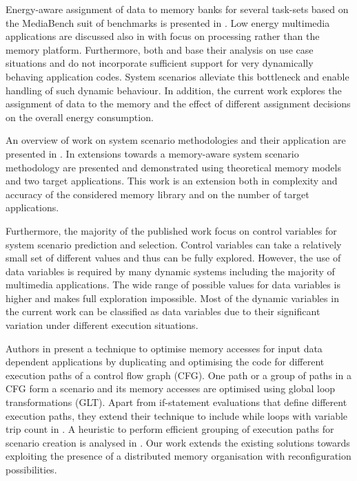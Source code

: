 \documentclass{acm_proc_article-sp}
\begin{document}
Energy-aware assignment of data to memory banks for several task-sets based on the MediaBench suit of benchmarks is presented in \cite{Mar03}. Low energy multimedia applications are discussed also in \cite{Chu02} with focus on processing rather than the memory platform. Furthermore, both \cite{Mar03} and \cite{Chu02} base their analysis on use case situations and do not incorporate sufficient support for very dynamically behaving application codes. System scenarios alleviate this bottleneck and enable handling of such dynamic behaviour. In addition, the current work explores the assignment of data to the memory and the effect of different assignment decisions on the overall energy consumption.

An overview of work on system scenario methodologies and their application are presented in \cite{Gheorghita2007}. In \cite{Fil12} extensions towards a memory-aware system scenario methodology are presented and demonstrated using theoretical memory models and two target applications. This work is an extension both in complexity and accuracy of the considered memory library and on the number of target applications. 

Furthermore, the majority of the published work focus on control variables for system scenario prediction and selection. Control variables can take a relatively small set of different values and thus can be fully explored. However, the use of data variables \cite{Elena2010} is required by many dynamic systems including the majority of multimedia applications. The wide range of possible values for data variables is higher and makes full exploration impossible. Most of the dynamic variables in the current work can be classified as data variables due to their significant variation under different execution situations. 

Authors in \cite{Pal06} present a technique to optimise memory accesses for input data dependent applications by duplicating and optimising the code for different execution paths of a control flow graph (CFG). One path or a group of paths in a CFG form a scenario and its memory accesses are optimised using global loop transformations (GLT). Apart from if-statement evaluations that define different execution paths, they extend their technique to include while loops with variable trip count in \cite{Pal06b}. A heuristic to perform efficient grouping of execution paths for scenario creation is analysed in \cite{Pal07}. Our work extends the existing solutions towards exploiting the presence of a distributed memory organisation with reconfiguration possibilities.
\end{document}
